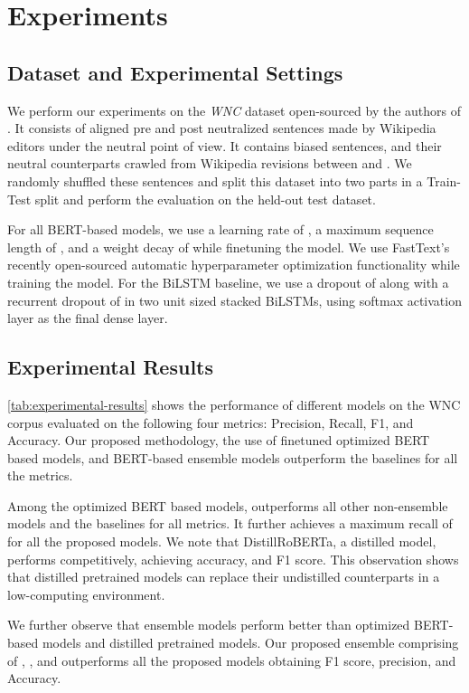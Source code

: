 \documentclass[sigconf,nonacm]{acmart}
\begin{document}
\section{Experiments}
\subsection{Dataset and Experimental Settings}
We perform our experiments on the \textit{WNC} dataset open-sourced by the authors of \cite{Jurafsky2020}.  It consists of aligned pre and post neutralized sentences made by Wikipedia editors under the neutral point of view. It contains  biased sentences, and their neutral counterparts crawled from  Wikipedia revisions between  and . We randomly shuffled these sentences and split this dataset into two parts in a  Train-Test split and perform the evaluation on the held-out test dataset. 

For all BERT-based models, we use a learning rate of , a maximum sequence length of , and a weight decay of  while finetuning the model. We use FastText's recently open-sourced automatic hyperparameter optimization functionality while training the model. For the BiLSTM baseline, we use a dropout of  along with a recurrent dropout of  in two  unit sized stacked BiLSTMs, using softmax activation layer as the final dense layer.

\subsection{Experimental Results}
\autoref{tab:experimental-results} shows the performance of different models on the WNC corpus evaluated on the following four metrics: Precision, Recall, F1, and Accuracy. Our proposed methodology, the use of finetuned optimized BERT based models, and BERT-based ensemble models outperform the baselines for all the metrics.

Among the optimized BERT based models,  outperforms all other non-ensemble models and the baselines for all metrics. It further achieves a maximum recall of  for all the proposed models. We note that DistillRoBERTa, a distilled model, performs competitively, achieving  accuracy, and  F1 score. This observation shows that distilled pretrained models can replace their undistilled counterparts in a low-computing environment.

We further observe that ensemble models perform better than optimized BERT-based models and distilled pretrained models. Our proposed ensemble comprising of , ,  and  outperforms all the proposed models obtaining  F1 score,  precision, and  Accuracy. 
\end{document}
